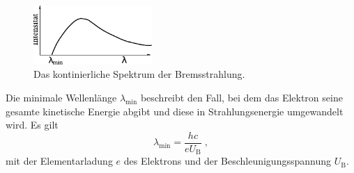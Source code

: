     \begin{figure}
        \centering
        \includegraphics[width=0.4\textwidth]{content/img/Abb_1.pdf}
        \caption{Das kontinierliche Spektrum der Bremsstrahlung. \cite{versuchsanleitung}}
        \label{fig:Bremsspektrum}
    \end{figure}

    Die minimale Wellenlänge $\lambda_\text{min}$ beschreibt den Fall,
    bei dem das Elektron seine gesamte kinetische Energie abgibt und diese in Strahlungsenergie umgewandelt wird.
    Es gilt
    \begin{equation*}
        \lambda_\text{min} = \frac{hc}{eU_\text{B}} \; ,
    \end{equation*}
    mit der Elementarladung $e$ des Elektrons und der Beschleunigungsspannung $U_\text{B}$.

